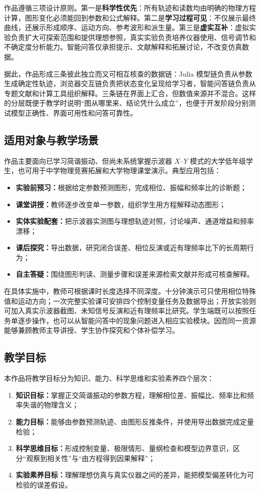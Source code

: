 \documentclass[UTF8,a4paper,zihao=-4]{ctexart}
\begin{document}
作品遵循三项设计原则。第一是\textbf{科学性优先}：所有轨迹和读数均由明确的物理方程计算，图形变化必须能回到参数和公式解释。第二是\textbf{学习过程可见}：不仅展示最终曲线，还展示形成顺序、运动方向、参考波形和派生量。第三是\textbf{虚实互补}：虚拟实验负责扩大可探索范围和提供理想参照，真实实验负责培养仪器使用、信号调节和不确定度分析能力。智能问答仅承担提示、文献解释和拓展讨论，不改变仿真数据。

据此，作品形成三条彼此独立而又可相互核查的数据链：Julia 模型链负责从参数生成确定性轨迹，浏览器交互链负责把状态变化呈现给学习者，智能问答链负责从专题文献和计算工具组织解释。三条链在界面上汇合，但数值来源并不混合。这样的分层既便于教学时说明“图从哪里来、结论凭什么成立”，也便于开发阶段分别测试模型正确性、界面可用性和问答可靠性。

\subsection{适用对象与教学场景}
作品主要面向已学习简谐振动、但尚未系统掌握示波器 $X$--$Y$ 模式的大学低年级学生，也可用于中学物理竞赛拓展和大学物理课堂演示。典型应用包括：
\begin{itemize}
  \item \textbf{实验前预习：}根据给定参数预测图形，完成相位、振幅和频率比的诊断题；
  \item \textbf{课堂讲授：}教师逐步改变单一参数，组织学生用方程解释动态图形；
  \item \textbf{实体实验配套：}把示波器实测图与理想轨迹对照，讨论噪声、通道增益和频率漂移；
  \item \textbf{课后探究：}导出数据，研究闭合误差、相位反演或近有理频率比下的长周期行为；
  \item \textbf{自主答疑：}围绕图形判读、测量步骤和误差来源检索文献并形成可核查解释。
\end{itemize}

在具体实施中，教师可根据课时长度选择不同深度。十分钟演示可只使用相位特殊值和运动方向；一次完整实验课可安排四个控制变量任务及数据导出；开放实验则可加入真实示波器截图、未知信号反演和近有理频率比研究。学生端既可以按照任务单逐步操作，也可以从智能问答中的现象问题进入相应实验模块。因而同一资源能够兼顾教师主导讲授、学生协作探究和个体补偿学习。

\subsection{教学目标}
本作品将教学目标分为知识、能力、科学思维和实验素养四个层次：
\begin{enumerate}
  \item \textbf{知识目标：}掌握正交简谐振动的参数方程，理解相位差、振幅比、频率比和频率失谐的物理含义；
  \item \textbf{能力目标：}能够由参数预测轨迹、由图形反推条件，并使用导出数据完成定量检验；
  \item \textbf{科学思维目标：}形成控制变量、极限情形、量纲检查和模型边界意识，区分“观察到相关性”与“由方程得到因果解释”；
  \item \textbf{实验素养目标：}理解理想仿真与真实仪器之间的差异，能把模型偏差转化为可检验的误差假设。
\end{enumerate}
\end{document}
